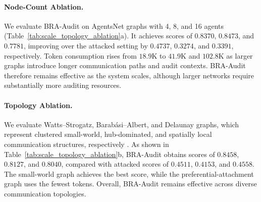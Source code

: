\documentclass[letterpaper]{article} %
\begin{document}

\paragraph{Node-Count Ablation.}
We evaluate BRA-Audit on AgentsNet graphs with 4, 8, and 16 agents
(Table~\ref{tab:scale_topology_ablation}a). It achieves scores of
\(0.8370\), \(0.8473\), and \(0.7781\), improving over the attacked
setting by \(0.4737\), \(0.3274\), and \(0.3391\), respectively.
Token consumption rises from \(18.9\)K to \(41.9\)K and \(102.8\)K as
larger graphs introduce longer communication paths and audit contexts.
BRA-Audit therefore remains effective as the system scales, although
larger networks require substantially more auditing resources.

\paragraph{Topology Ablation.}
We evaluate Watts--Strogatz, Barabási--Albert, and Delaunay graphs,
which represent clustered small-world, hub-dominated, and spatially
local communication structures, respectively
\citep{grötschla2025agentsnetcoordinationcollaborativereasoning}.
As shown in Table~\ref{tab:scale_topology_ablation}b, BRA-Audit obtains
scores of \(0.8458\), \(0.8127\), and \(0.8040\), compared with attacked
scores of \(0.4511\), \(0.4153\), and \(0.4558\). The small-world graph
achieves the best score, while the preferential-attachment graph uses
the fewest tokens. Overall, BRA-Audit remains effective across diverse
communication topologies.
\end{document}
